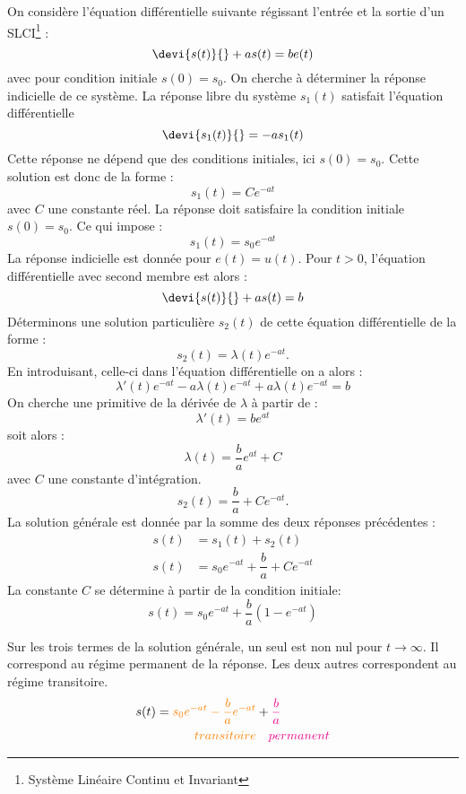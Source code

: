 On considère l'équation différentielle suivante régissant l'entrée
et la sortie d'un SLCI\footnote{Système Linéaire Continu et Invariant} :
$$
\devi{s(t)}{}+as(t)=be(t)
$$
avec pour condition initiale $s(0)=s_0$.
On cherche à déterminer la réponse indicielle de ce système.
La réponse libre du système $s_1(t)$ satisfait l'équation différentielle
$$
\devi{s_1(t)}{}=-as_1(t)
$$
Cette réponse ne dépend que des conditions initiales, ici $s(0)=s_0$.
Cette solution est donc de la forme :
$$
s_1(t)=Ce^{-at}
$$
avec $C$ une constante réel. La réponse doit satisfaire la condition 
initiale $s(0)=s_0$. Ce qui impose :
$$
s_1(t)=s_0e^{-at}
$$
La réponse indicielle est donnée pour $e(t)=u(t)$. Pour $t>0$, l'équation 
différentielle avec second membre est alors :
$$
\devi{s(t)}{}+as(t)=b
$$
Déterminons une solution particulière $s_2(t)$ de cette équation 
différentielle de la forme :
$$
s_2(t)=\lambda(t)e^{-at}.
$$
En introduisant, celle-ci dans l'équation différentielle on a alors :
$$
\lambda'(t)e^{-at}-a\lambda(t)e^{-at}+a\lambda(t)e^{-at}=b
$$
On cherche une primitive de la dérivée de $\lambda$ à partir de :
$$
\lambda'(t)=be^{at}
$$
soit alors :
$$
\lambda(t)=\dfrac{b}{a}e^{at}+C
$$
avec $C$ une constante d'intégration.
$$
s_2(t)=\dfrac{b}{a}+Ce^{-at}.
$$
La solution générale est donnée par la somme des deux réponses précédentes :
\begin{align*}
    s(t)&=s_1(t)+s_2(t)\\
    s(t)&=s_0e^{-at}+\dfrac{b}{a}+Ce^{-at}
\end{align*}
La constante $C$ se détermine à partir de la condition initiale:
$$
s(t)=s_0e^{-at}+\dfrac{b}{a}\left(1-e^{-at}\right)
$$
\begin{center}

\end{center}
Sur les trois termes de la solution générale, un seul est non
nul pour $t\to\infty$. Il correspond au régime permanent de
la réponse. Les deux autres correspondent au régime transitoire.
\begin{align*}
    s(t)=\textcolor{orange}{s_0e^{-at}-\dfrac{b}{a}e^{-at}}&+
    \textcolor{magenta}{\dfrac{b}{a}}\\
    \textcolor{orange}{transitoire} &\quad\textcolor{magenta}{permanent}
\end{align*}
